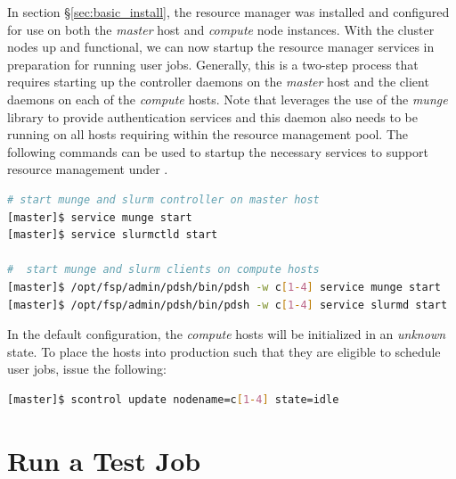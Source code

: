 \documentclass[letterpaper]{article}
\begin{document}
In section \S\ref{sec:basic_install}, the \SLURM{} resource manager was installed
and configured for use on both the {\em master} host and {\em compute} node
instances. With the cluster nodes up and functional, we can now startup the
resource manager services in preparation for running user jobs. Generally, this
is a two-step process that requires starting up the controller daemons on the {\em
  master} host and the client daemons on each of the {\em compute} hosts.  
Note that \SLURM{} leverages the use of the {\em munge} library to provide
authentication services and this daemon also needs to be running on all hosts
requiring within the resource management pool. 
The following commands can be used to startup the necessary services to support
resource management under \SLURM{}.

\begin{lstlisting}[language=bash]
# start munge and slurm controller on master host
[master]$ service munge start
[master]$ service slurmctld start

#  start munge and slurm clients on compute hosts
[master]$ /opt/fsp/admin/pdsh/bin/pdsh -w c[1-4] service munge start
[master]$ /opt/fsp/admin/pdsh/bin/pdsh -w c[1-4] service slurmd start
\end{lstlisting}

In the default configuration, the {\em compute} hosts will be initialized in an
{\em unknown} state. To place the hosts into production such that they are
eligible to schedule user jobs, issue the following:


\begin{lstlisting}[language=bash]
[master]$ scontrol update nodename=c[1-4] state=idle
\end{lstlisting}


\section{Run a Test Job}
\end{document}
